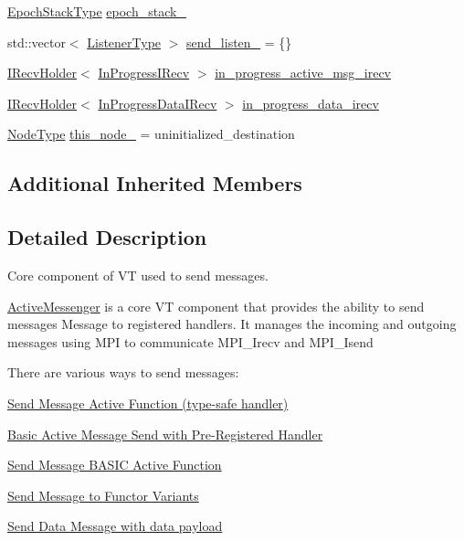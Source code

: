 \begin{DoxyCompactItemize}
\item 
\hyperlink{structvt_1_1messaging_1_1_active_messenger_a746358029c37dabf2b4c8ad26642aee9}{Epoch\+Stack\+Type} \hyperlink{structvt_1_1messaging_1_1_active_messenger_a477f7599bd71cba2865e49f3610e6025}{epoch\+\_\+stack\+\_\+}
\item 
std\+::vector$<$ \hyperlink{structvt_1_1messaging_1_1_active_messenger_a63878fd4ef1fbc505bd1313d32049ca9}{Listener\+Type} $>$ \hyperlink{structvt_1_1messaging_1_1_active_messenger_a52779f8ed30e23442a802e42c3462a0b}{send\+\_\+listen\+\_\+} = \{\}
\item 
\hyperlink{structvt_1_1messaging_1_1_i_recv_holder}{I\+Recv\+Holder}$<$ \hyperlink{structvt_1_1messaging_1_1_in_progress_i_recv}{In\+Progress\+I\+Recv} $>$ \hyperlink{structvt_1_1messaging_1_1_active_messenger_aaa384d58565da05b8b3ac60c5ee68ee0}{in\+\_\+progress\+\_\+active\+\_\+msg\+\_\+irecv}
\item 
\hyperlink{structvt_1_1messaging_1_1_i_recv_holder}{I\+Recv\+Holder}$<$ \hyperlink{structvt_1_1messaging_1_1_in_progress_data_i_recv}{In\+Progress\+Data\+I\+Recv} $>$ \hyperlink{structvt_1_1messaging_1_1_active_messenger_aabf031983b435e4cf20d16dd561f179d}{in\+\_\+progress\+\_\+data\+\_\+irecv}
\item 
\hyperlink{namespacevt_a866da9d0efc19c0a1ce79e9e492f47e2}{Node\+Type} \hyperlink{structvt_1_1messaging_1_1_active_messenger_a44428f493f635833b6b8da6a6dfcf08f}{this\+\_\+node\+\_\+} = uninitialized\+\_\+destination
\end{DoxyCompactItemize}
\subsection*{Additional Inherited Members}


\subsection{Detailed Description}
Core component of VT used to send messages. 

\hyperlink{structvt_1_1messaging_1_1_active_messenger}{Active\+Messenger} is a core VT component that provides the ability to send messages {\ttfamily Message} to registered handlers. It manages the incoming and outgoing messages using M\+PI to communicate {\ttfamily M\+P\+I\+\_\+\+Irecv} and {\ttfamily M\+P\+I\+\_\+\+Isend} 

There are various ways to send messages\+:
\begin{DoxyItemize}
\item \hyperlink{group__typesafehan}{Send Message Active Function (type-\/safe handler)}
\item \hyperlink{group__preregister}{Basic Active Message Send with Pre-\/\+Registered Handler}
\item \hyperlink{group__basicsend}{Send Message B\+A\+S\+IC Active Function}
\item \hyperlink{group__functorsend}{Send Message to Functor Variants}
\item \hyperlink{group__sendpayload}{Send Data Message with data payload} 
\end{DoxyItemize}

